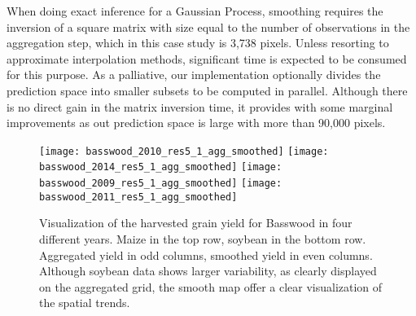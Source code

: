 When doing exact inference for a Gaussian Process, smoothing requires
the inversion of a square matrix with size equal to the number of
observations in the aggregation step, which in this case study is
3,738 pixels. Unless resorting to approximate interpolation methods,
significant time is expected to be consumed for this purpose. As a
palliative, our implementation optionally divides the prediction space
into smaller subsets to be computed in parallel. Although there is no
direct gain in the matrix inversion time, it provides with some
marginal improvements as out prediction space is large with more than
90,000 pixels.


\begin{figure}[h!]  \centering
  \texttt{[image: basswood\_2010\_res5\_1\_agg\_smoothed]}
  \texttt{[image: basswood\_2014\_res5\_1\_agg\_smoothed]}
  \texttt{[image: basswood\_2009\_res5\_1\_agg\_smoothed]}
  \texttt{[image: basswood\_2011\_res5\_1\_agg\_smoothed]}
  \caption[Visualization of the algorithm output for one field across
  four different years]{Visualization of the harvested grain yield for
    Basswood in four different years. Maize in the top row, soybean in
    the bottom row. Aggregated yield in odd columns, smoothed yield in
    even columns. Although soybean data shows larger variability, as
    clearly displayed on the aggregated grid, the smooth map offer a
    clear visualization of the spatial trends. }
  \label{fig:basswood-history}
\end{figure}

